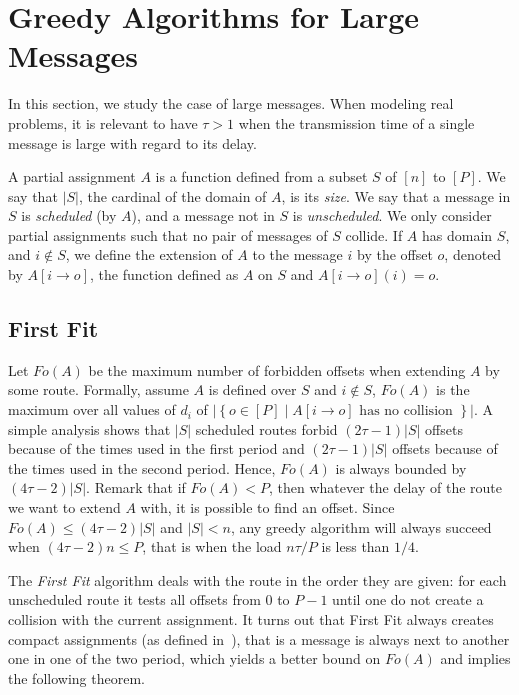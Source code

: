 \documentclass[10pt, conference, letterpaper]{algotel}
\begin{document}
\section{Greedy Algorithms for Large Messages} \label{sec:large}

In this section, we study the case of large messages. When modeling real problems,
it is relevant to have $\tau > 1$ when the transmission time of a single message is large with regard to its delay.

A partial assignment $A$ is a function defined from a subset $S$ of $[n]$ to $[P]$.
We say that $|S|$, the cardinal of the domain of $A$, is its \emph{size}.
We say that a message in $S$ is \emph{scheduled} (by $A$), and a message not in $S$ is \emph{unscheduled}. We only consider partial assignments such that no pair of messages of $S$ collide. If $A$ has domain $S$, and $i \notin S$, we define the extension of $A$ to the message $i$ by the offset $o$, denoted by $A[i \rightarrow o]$, the function defined as $A$ on $S$ and $A[i \rightarrow o](i) = o$.


\subsection{First Fit}


Let $Fo(A)$ be the maximum number of forbidden offsets when extending $A$ by some route. Formally, assume $A$ is defined over $S$ and $i\notin S$, $Fo(A)$ is the maximum over all values of $d_i$ of $|\left\{ o \in [P] \mid A[i \rightarrow o] \text{ has no collision }\right\}|$.
A simple analysis shows that $|S|$ scheduled routes forbid $(2 \tau -1)|S|$ offsets because of the times used in the first period and $(2 \tau -1)|S|$ offsets because of the times used in the second period. Hence, $Fo(A)$ is always bounded by $(4 \tau -2)|S|$.  Remark that if $Fo(A) < P$, then whatever the delay of the route we want to extend $A$ with, it is possible to find an offset. Since $Fo(A) \leq (4 \tau -2)|S|$ and $|S| < n$,  any greedy algorithm will always succeed when $(4 \tau -2)n \leq P$, that is when the load $ n\tau /P$ is less than $1/4$.


The \emph{First Fit} algorithm deals with the route in the order they are given:  for each unscheduled route it tests all offsets from $0$ to $P-1$ until one do not create a collision with the current assignment. It turns out that First Fit always creates compact assignments (as defined in~\cite{dominique2018deterministic}), that is a message is always next to another one in one of the two period, which yields a better bound on $Fo(A)$ and implies the following theorem.
\end{document}
